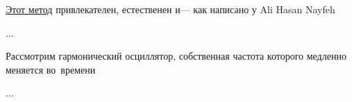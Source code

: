 

\begin{otherlanguage}{russian}

\href{https://en.wikipedia.org/wiki/Multiple-scale_analysis}{Этот метод} привлекателен, естественен и\:--- как написано у Ali Hasan Nayfeh

...



\end{otherlanguage}



\begin{otherlanguage}{russian}

Рассмотрим гармонический осциллятор, собственная частота которого медленно меняется во~времени

...



\end{otherlanguage}



